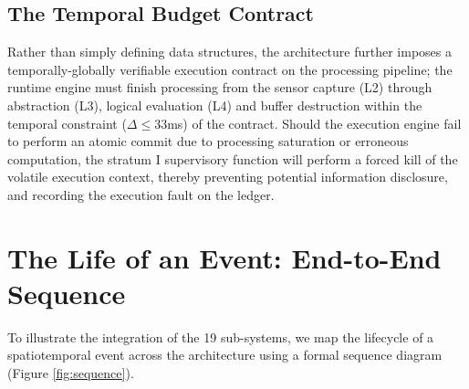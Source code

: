 \documentclass[conference]{IEEEtran}
\begin{document}
\subsection{The Temporal Budget Contract}
Rather than simply defining data structures, the architecture further imposes a temporally-globally verifiable execution contract on the processing pipeline; the runtime engine must finish processing from the sensor capture (L2) through abstraction (L3), logical evaluation (L4) and buffer destruction within the temporal constraint ($\Delta \le 33$ms) of the contract. Should the execution engine fail to perform an atomic commit due to processing saturation or erroneous computation, the stratum I supervisory function will perform a forced kill of the volatile execution context, thereby preventing potential information disclosure, and recording the execution fault on the ledger.

\section{The Life of an Event: End-to-End Sequence}

To illustrate the integration of the 19 sub-systems, we map the lifecycle of a spatiotemporal event across the architecture using a formal sequence diagram (Figure \ref{fig:sequence}).
\end{document}
